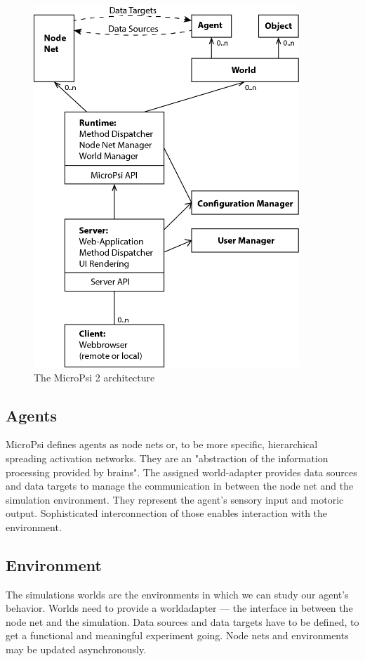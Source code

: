 \begin{figure}[h]
  \centering
    \includegraphics[width=10cm]{graphics/micropsi2_uml}
  \caption{The MicroPsi 2 architecture~\cite{conf/agi/Bach12}}
  \label{micropsi2_modules}
\end{figure}
            
        \subsection{Agents}
MicroPsi defines agents as node nets or, to be more specific, hierarchical spreading activation networks. They are an "abstraction of the information processing provided by brains". The assigned world-adapter provides data sources and data targets to manage the communication in between the node net and the simulation environment. They represent the agent's sensory input and motoric output. Sophisticated interconnection of those enables interaction with the environment.~\cite{conf/agi/Bach12}
       
        \subsection{Environment}
The simulations worlds are the environments in which we can study our agent's behavior. Worlds need to provide a worldadapter --- the interface in between the node net and the simulation. Data sources and data targets have to be defined, to get a functional and meaningful experiment going. Node nets and environments may be updated asynchronously.~\cite{conf/agi/Bach12}

